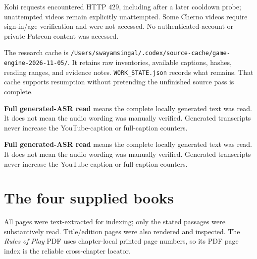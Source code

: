 Kohi requests encountered HTTP 429, including after a later cooldown probe; unattempted videos remain explicitly unattempted. Some Cherno videos require sign-in/age verification and were not accessed. No authenticated-account or private Patreon content was accessed.

The research cache is \texttt{/Users/swayamsingal/.codex/source-cache/game-engine-2026-11-05/}. It retains raw inventories, available captions, hashes, reading ranges, and evidence notes. \texttt{WORK\_STATE.json} records what remains. That cache supports resumption without pretending the unfinished source pass is complete.

\textbf{Full generated-ASR read} means the complete locally generated text was read. It does not mean the audio wording was manually verified. Generated transcripts never increase the YouTube-caption or full-caption counters.

\textbf{Full generated-ASR read} means the complete locally generated text was read. It does not mean the audio wording was manually verified. Generated transcripts never increase the YouTube-caption or full-caption counters.

\section{The four supplied books}\label{appendix-877738f6f4d2-the-four-supplied-books}

All pages were text-extracted for indexing; only the stated passages were substantively read. Title/edition pages were also rendered and inspected. The \emph{Rules of Play} PDF uses chapter-local printed page numbers, so its PDF page index is the reliable cross-chapter locator.

